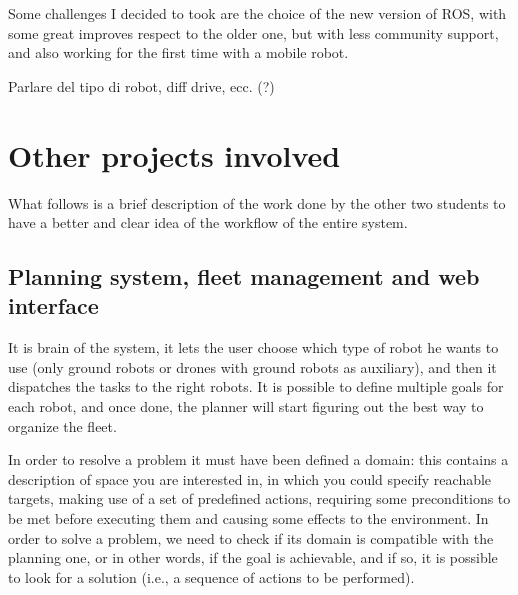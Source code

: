 Some challenges I decided to took are the choice of the new version of ROS, with some great improves respect to the older one, but with less community support, and also working for the first time with a mobile robot.

Parlare del tipo di robot, diff drive, ecc. (?)



\section{Other projects involved}

What follows is a brief description of the work done by the other two students to have a better and clear idea of the workflow of the entire system.

\subsection{Planning system, fleet management and web interface}
\label{sub:planning}

It is brain of the system, it lets the user choose which type of robot he wants to use (only ground robots or drones with ground robots as auxiliary), and then it dispatches the tasks to the right robots. It is possible to define multiple goals for each robot, and once done, the planner will start figuring out the best way to organize the fleet.

In order to resolve a problem it must have been defined a domain: this contains a description of space you are interested in, in which you could specify reachable targets, making use of a set of predefined actions, requiring some preconditions to be met before executing them and causing some effects to the environment. In order to solve a problem, we need to check if its domain is compatible with the planning one, or in other words, if the goal is achievable, and if so, it is possible to look for a solution (i.e., a sequence of actions to be performed).


